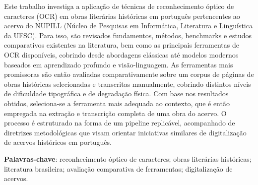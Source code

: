 \documentclass[
  12pt,
  oneside,
  a4paper,
  chapter=TITLE,
  section=TITLE,
  english,
  brazil
]{abntex2}
\begin{document}
\begin{resumo}

Este trabalho investiga a aplicação de técnicas de reconhecimento óptico de caracteres
(OCR) em obras literárias históricas em português pertencentes ao acervo do NUPILL
(Núcleo de Pesquisas em Informática, Literatura e Linguística da UFSC). Para isso,
são revisados fundamentos, métodos, benchmarks e estudos comparativos existentes na
literatura, bem como as principais ferramentas de OCR disponíveis, cobrindo desde
abordagens clássicas até modelos modernos baseados em aprendizado profundo e
visão-linguagem. As ferramentas mais promissoras são então avaliadas comparativamente
sobre um corpus de páginas de obras históricas selecionadas e transcritas manualmente,
cobrindo distintos níveis de dificuldade tipográfica e de degradação física. Com base
nos resultados obtidos, seleciona-se a ferramenta mais adequada ao contexto, que é
então empregada na extração e transcrição completa de uma obra do acervo. O processo
é estruturado na forma de um pipeline replicável, acompanhado de diretrizes
metodológicas que visam orientar iniciativas similares de digitalização de acervos
históricos em português.

\vspace{\onelineskip}

\noindent
\textbf{Palavras-chave}: reconhecimento óptico de caracteres; obras literárias
históricas; literatura brasileira; avaliação comparativa de ferramentas;
digitalização de acervos.

\end{resumo}
\end{document}
